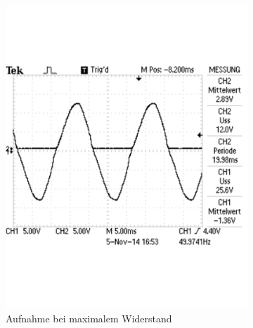 \documentclass[12pt,a4paper]{article}
\begin{document}
\begin{figure}[H]
        \centering
        \begin{subfigure}[b]{0.48\textwidth}
                \includegraphics[width=\textwidth , scale = 0.4]{2_3_1.pdf}
                \caption[Aufnahme bei maximalem Widerstand]{Aufnahme bei maximalem Widerstand}
 				 \label{fig:2_3_1}
        \end{subfigure}%
        \hfill
        \begin{subfigure}[b]{0.48\textwidth}

\end{subfigure}
\end{figure}
\end{document}
